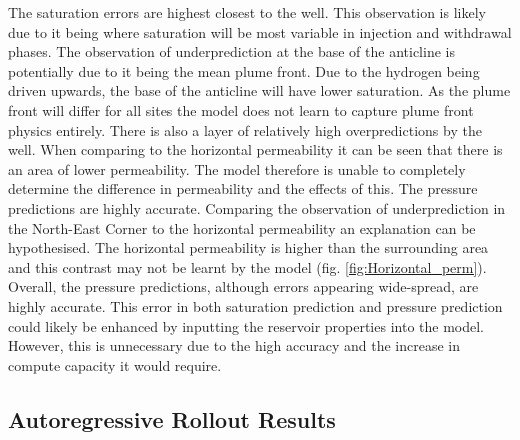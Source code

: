 The saturation errors are highest closest to the well. This observation is likely due to it being where saturation will be most variable in injection and withdrawal phases. The observation of underprediction at the base of the anticline is potentially due to it being the mean plume front. Due to the hydrogen being driven upwards, the base of the anticline will have lower saturation. As the plume front will differ for all sites the model does not learn to capture plume front physics entirely. There is also a layer of relatively high overpredictions by the well. When comparing to the horizontal permeability it can be seen that there is an area of lower permeability. The model therefore is unable to completely determine the difference in permeability and the effects of this. The pressure predictions are highly accurate. Comparing the observation of underprediction in the North-East Corner to the horizontal permeability an explanation can be hypothesised. The horizontal permeability is higher than the surrounding area and this contrast may not be learnt by the model (fig. \ref{fig:Horizontal_perm}). Overall, the pressure predictions, although errors appearing wide-spread, are highly accurate. This error in both saturation prediction and pressure prediction could likely be enhanced by inputting the reservoir properties into the model. However, this is unnecessary due to the high accuracy and the increase in compute capacity it would require.
\FloatBarrier
\subsection{Autoregressive Rollout Results}

